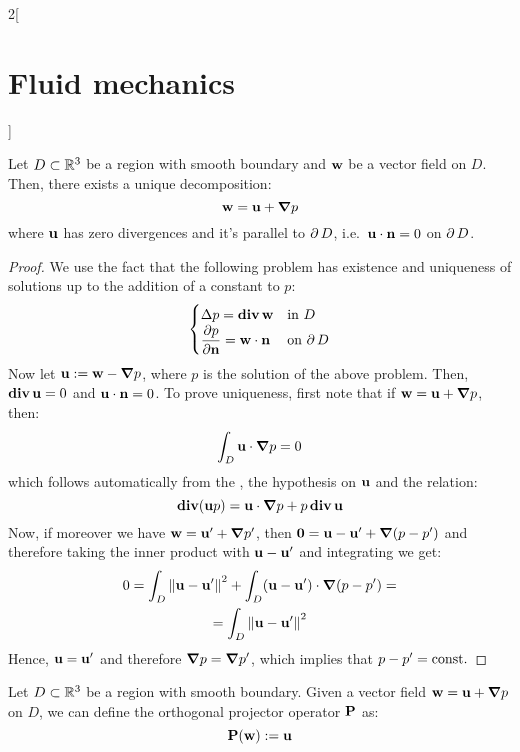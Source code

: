 \documentclass[../../../main_physics.tex]{subfiles}
\begin{document}
\begin{multicols}{2}[\section{Fluid mechanics}]
\begin{remark}
  \end{remark}
  \begin{theorem}
    Let $D\subset\mathbb{R}^3$ be a region with smooth boundary and $\boldsymbol{\mathrm{w}}$ be a vector field on $D$. Then, there exists a unique decomposition:
    $$
      \boldsymbol{\mathrm{w}}=\boldsymbol{\mathrm{u}}+\grad p
    $$
    where $\boldsymbol{\mathrm{u}}$ has zero divergences and it's parallel to $\operatorname{\partial}{D}$, i.e.\ $\boldsymbol{\mathrm{u}}\cdot\boldsymbol{\mathrm{n}}=0$ on $\operatorname{\partial}{D}$.
  \end{theorem}
  \begin{proof}
    We use the fact that the following problem has existence and uniqueness of solutions up to the addition of a constant to $p$:
    $$
      \begin{cases}
        \displaystyle\Delta p =\operatorname{\boldsymbol{\mathrm{div}}} \boldsymbol{\mathrm{w}}           & \text{in $D$}      \\
        \displaystyle \pdv{p}{\boldsymbol{\mathrm{n}}}=\boldsymbol{\mathrm{w}}\cdot \boldsymbol{\mathrm{n}} & \text{on $\operatorname{\partial}{D}$}
      \end{cases}
    $$
    Now let $\boldsymbol{\mathrm{u}}:=\boldsymbol{\mathrm{w}}-\grad p$, where $p$ is the solution of the above problem. Then, $\operatorname{\boldsymbol{\mathrm{div}}} \boldsymbol{\mathrm{u}}=0$ and $\boldsymbol{\mathrm{u}}\cdot\boldsymbol{\mathrm{n}}=0$. To prove uniqueness, first note that if $\boldsymbol{\mathrm{w}}=\boldsymbol{\mathrm{u}}+\grad p$, then:
    $$
      \int_D\boldsymbol{\mathrm{u}}\cdot \grad p=0
    $$
    which follows automatically from the , the hypothesis on $\boldsymbol{\mathrm{u}}$ and the relation:
    $$
      \operatorname{\boldsymbol{\mathrm{div}}}(\boldsymbol{\mathrm{u}}p)=\boldsymbol{\mathrm{u}}\cdot\grad p+p\operatorname{\boldsymbol{\mathrm{div}}}\boldsymbol{\mathrm{u}}
    $$
    Now, if moreover we have $\boldsymbol{\mathrm{w}}=\boldsymbol{\mathrm{u}}'+\grad p'$, then $\boldsymbol{\mathrm{0}}= \boldsymbol{\mathrm{u}}-\boldsymbol{\mathrm{u}}' + \grad(p-p')$ and therefore taking the inner product with $\boldsymbol{\mathrm{u}}-\boldsymbol{\mathrm{u}}'$ and integrating we get:
    \begin{multline*}
      0=\int_D\left\|\boldsymbol{\mathrm{u}}-\boldsymbol{\mathrm{u}}'\right\|^2+\int_D(\boldsymbol{\mathrm{u}}-\boldsymbol{\mathrm{u}}')\cdot\grad(p-p')= \\
      =\int_D\left\|\boldsymbol{\mathrm{u}}-\boldsymbol{\mathrm{u}}'\right\|^2
    \end{multline*}
    Hence, $\boldsymbol{\mathrm{u}}=\boldsymbol{\mathrm{u}}'$ and therefore $\grad p=\grad p'$, which implies that $p-p'=\text{const.}$
  \end{proof}
  \begin{definition}
    Let $D\subset\mathbb{R}^3$ be a region with smooth boundary. Given a vector field $\boldsymbol{\mathrm{w}}=\boldsymbol{\mathrm{u}}+\grad p$ on $D$, we can define the orthogonal projector operator $\boldsymbol{\mathrm{P}}$ as:
    $$
      \boldsymbol{\mathrm{P}}(\boldsymbol{\mathrm{w}}):=\boldsymbol{\mathrm{u}}
    $$
  \end{definition}
\end{multicols}
\end{document}
